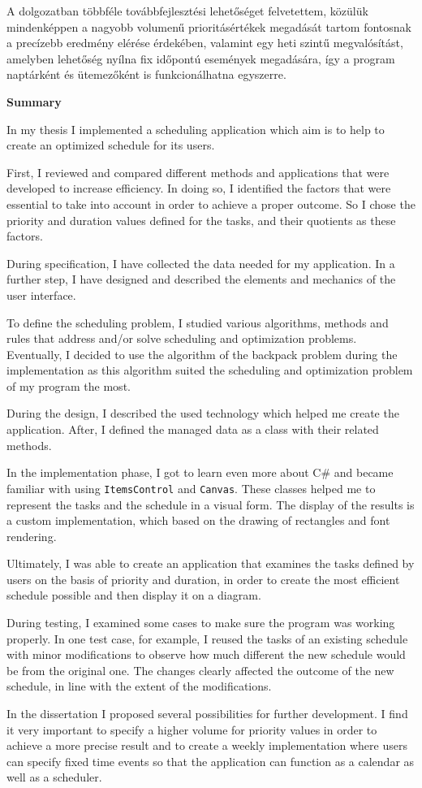 A dolgozatban többféle továbbfejlesztési lehetőséget felvetettem, közülük mindenképpen a nagyobb volumenű prioritásértékek megadását tartom fontosnak a precízebb eredmény elérése érdekében, valamint egy heti szintű megvalósítást, amelyben lehetőség nyílna fix időpontú események megadására, így a program naptárként és ütemezőként is funkcionálhatna egyszerre.

\newpage
\begin{LARGE}
\textbf{Summary}
\end{LARGE}
\vskip 1cm

In my thesis I implemented a scheduling application which aim is to help to create an optimized schedule for its users.

First, I reviewed and compared different methods and applications that were developed to increase efficiency. In doing so, I identified the factors that were essential to take into account in order to achieve a proper outcome. So I chose the priority and duration values defined for the tasks, and their quotients as these factors.

During specification, I have collected the data needed for my application.
In a further step, I have designed and described the elements and mechanics of the user interface.

To define the scheduling problem, I studied various algorithms, methods and rules that address and/or solve scheduling and optimization problems. Eventually, I decided to use the algorithm of the backpack problem during the implementation as this algorithm suited the scheduling and optimization problem of my program the most.

During the design, I described the used technology which helped me create the application. After, I defined the managed data as a class with their related methods. 

In the implementation phase, I got to learn even more about C\# and became familiar with using \texttt{ItemsControl} and \texttt{Canvas}. These classes helped me to represent the tasks and the schedule in a visual form.
The display of the results is a custom implementation, which based on the drawing of rectangles and font rendering.

Ultimately, I was able to create an application that examines the tasks defined by users on the basis of priority and duration, in order to create the most efficient schedule possible and then display it on a diagram.

During testing, I examined some cases to make sure the program was working properly. In one test case, for example, I reused the tasks of an existing schedule with minor modifications to observe how much different the new schedule would be from the original one. The changes clearly affected the outcome of the new schedule, in line with the extent of the modifications.

In the dissertation I proposed several possibilities for further development. I find it very important to specify a higher volume for priority values in order to achieve a more precise result and to create a weekly implementation where users can specify fixed time events so that the application can function as a calendar as well as a scheduler.
